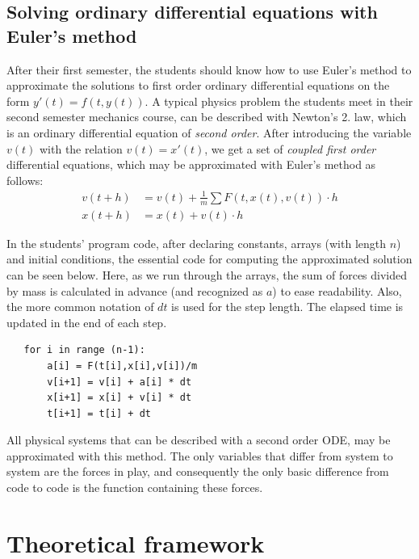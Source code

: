 \documentclass[aps,prb,floatfix,twocolumn,twoside,english]{revtex4-1}
\begin{document}
\subsection{Solving ordinary differential equations with Euler's method}

After their first semester, the students should know how to use Euler's method to approximate the solutions to first order ordinary differential equations on the form $y'(t) = f(t,y(t))$. A typical physics problem the students meet in their second semester mechanics course, can be described with Newton's 2. law, which is an ordinary differential equation of \textit{second order}. After introducing the variable $v(t)$ with the relation $v(t) = x'(t)$, we get a set of \textit{coupled first order} differential equations, which may be approximated with Euler's method as follows:
\noindent 
\begin{subequations}
\begin{align}
  v(t+h) &= v(t) + \frac{1}{m}\sum F(t,x(t),v(t)) \cdot h \nonumber \\
  x(t+h) &= x(t) + v(t) \cdot h \nonumber
\end{align}
\end{subequations}

In the students' program code, after declaring constants, arrays (with length $n$) and initial conditions, the essential code for computing the approximated solution can be seen below. Here, as we run through the arrays, the sum of forces divided by mass is calculated in advance (and recognized as $a$) to ease readability. Also, the more common notation of $dt$ is used for the step length. The elapsed time is updated in the end of each step.

\begin{small}
\begin{verbatim}
   for i in range (n-1):
       a[i] = F(t[i],x[i],v[i])/m
       v[i+1] = v[i] + a[i] * dt
       x[i+1] = x[i] + v[i] * dt
       t[i+1] = t[i] + dt
\end{verbatim}
\end{small}

\noindent All physical systems that can be described with a second order ODE, may be approximated with this method. The only variables that differ from system to system are the forces in play, and consequently the only basic difference from code to code is the function containing these forces.


\section{Theoretical framework}
\label{sec:theory}
\end{document}
